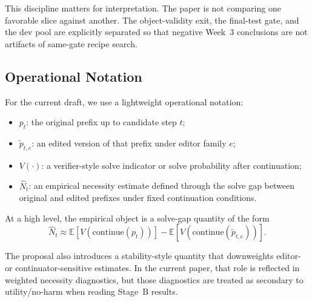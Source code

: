This discipline matters for interpretation. The paper is not comparing one favorable slice against another. The object-validity exit, the final-test gate, and the dev pool are explicitly separated so that negative Week~3 conclusions are not artifacts of same-gate recipe search.

\subsection{Operational Notation}

For the current draft, we use a lightweight operational notation:

\begin{itemize}
  \item $p_t$: the original prefix up to candidate step $t$;
  \item $\tilde{p}_{t,e}$: an edited version of that prefix under editor family $e$;
  \item $V(\cdot)$: a verifier-style solve indicator or solve probability after continuation;
  \item $\hat{N}_t$: an empirical necessity estimate defined through the solve gap between original and edited prefixes under fixed continuation conditions.
\end{itemize}

At a high level, the empirical object is a solve-gap quantity of the form
\[
\hat{N}_t \approx \mathbb{E}[V(\text{continue}(p_t))] - \mathbb{E}[V(\text{continue}(\tilde{p}_{t,e}))].
\]

The proposal also introduces a stability-style quantity that downweights editor- or continuator-sensitive estimates. In the current paper, that role is reflected in weighted necessity diagnostics, but those diagnostics are treated as secondary to utility/no-harm when reading Stage~B results.
